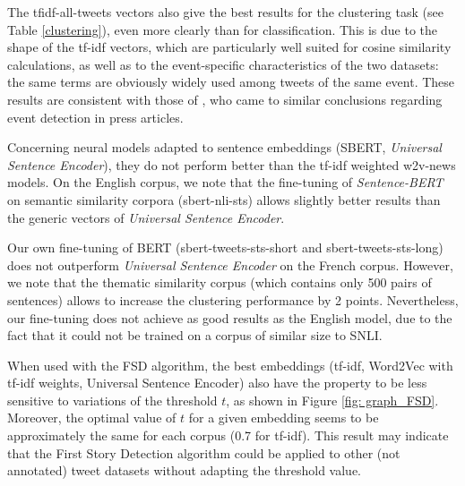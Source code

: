 The tfidf-all-tweets vectors also give the best results for the clustering task (see Table \ref{clustering}), even more clearly than for classification. This is due to the shape of the tf-idf vectors, which are particularly well suited for cosine similarity calculations, as well as to the event-specific characteristics of the two datasets: the same terms are obviously widely used among tweets of the same event.
These results are consistent with those of \citet{cage2020production}, who came to similar conclusions regarding event detection in press articles.

Concerning neural models adapted to sentence embeddings (SBERT, \textit{Universal Sentence Encoder}), they do not perform better than the tf-idf weighted w2v-news models. On the English corpus, we note that the fine-tuning of \textit{Sentence-BERT} on semantic similarity corpora (sbert-nli-sts) allows slightly better results than the generic vectors of \textit{Universal Sentence Encoder}.

Our own fine-tuning of BERT (sbert-tweets-sts-short and sbert-tweets-sts-long) does not outperform \textit{Universal Sentence Encoder} on the French corpus. However, we note that the thematic similarity corpus (which contains only 500 pairs of sentences) allows to increase the clustering performance by 2 points. Nevertheless, our fine-tuning does not achieve as good results as the English model, due to the fact that it could not be trained on a corpus of similar size to SNLI.

When used with the FSD algorithm, the 
best embeddings (tf-idf, Word2Vec with tf-idf weights,
Universal Sentence Encoder) also have the property to be
less sensitive to variations of the threshold $t$, as shown in
Figure \ref{fig: graph_FSD}. Moreover, the optimal value of $t$ for a
given embedding seems to be approximately the same for
each corpus (0.7 for tf-idf). This result may indicate that
the First Story Detection algorithm could be applied to
other (not annotated) tweet datasets without adapting the
threshold value.

